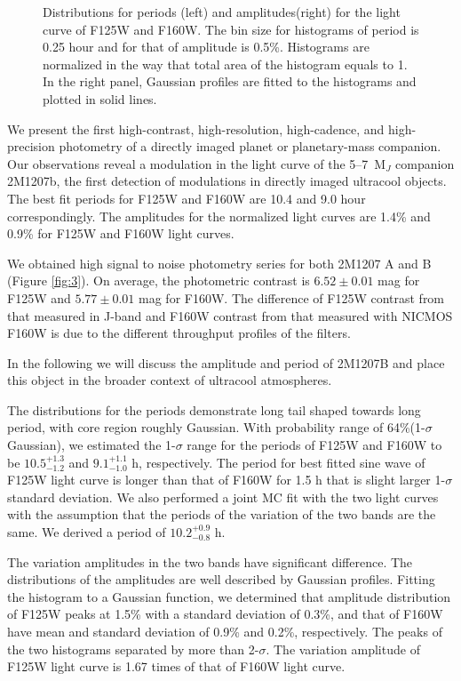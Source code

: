 \documentclass[apj]{emulateapj}
\begin{document}
\begin{figure*}
  \centering
  \caption{Distributions for periods (left) and amplitudes(right) for the light
    curve of F125W and F160W. The bin size for histograms of period is
  0.25 hour and for that of amplitude is 0.5\%. Histograms are
  normalized in the way that total area of the histogram equals to
  1. In the right panel, Gaussian profiles are fitted to the
  histograms and plotted in solid lines.}
  \label{fig:4}
\end{figure*}

\label{Results}
We present the first high-contrast, high-resolution, high-cadence, and
high-precision photometry of a directly imaged planet or
planetary-mass companion. Our observations reveal a modulation in the
light curve of the 5--7~M$_{J}$ companion 2M1207b, the first detection
of modulations in directly imaged ultracool objects.  The best fit
periods for F125W and F160W are 10.4 and 9.0 hour correspondingly. The
amplitudes for the normalized light curves are 1.4\% and 0.9\% for
F125W and F160W light curves. 

We obtained high signal to noise photometry series for both 2M1207 A
and B (Figure \ref{fig:3}). On average, the photometric contrast is
$6.52\pm0.01$ mag for
F125W and $5.77\pm0.01$ mag for F160W. The difference of F125W contrast
from that measured in J-band \citep{Mohanty2007} and
F160W contrast from that measured with NICMOS F160W 
\citep{Song2006} is due to the different throughput profiles of the
filters.

In the following we will discuss the amplitude and period of 2M1207B
and place this object in the broader context of ultracool atmospheres.

The distributions for the periods demonstrate long tail shaped towards
long period, with core region roughly Gaussian. With probability range
of 64\%(1-$\sigma$ Gaussian), we estimated the 1-$\sigma$ range for
the periods of F125W and F160W to be  $10.5_{-1.2}^{+1.3}$ and
$9.1_{-1.0}^{+1.1}$ h, respectively. The period for best
fitted sine wave of F125W light curve is longer than that of F160W for
1.5 h that is slight larger 1-$\sigma$ standard deviation. We also
performed a joint MC fit with the two light curves with the assumption
that the periods of the variation of the two bands are the same. We
derived a period of $10.2^{+0.9}_{-0.8}$ h. 

The variation amplitudes in the two bands have significant
difference. The distributions of the amplitudes are well described by
Gaussian profiles. Fitting the histogram to a Gaussian function, we
determined that amplitude distribution of F125W peaks at 1.5\% with a
standard deviation of 0.3\%, and that of F160W have mean and standard
deviation of 0.9\% and 0.2\%, respectively. The peaks of the two
histograms separated by more than 2-$\sigma$. The variation amplitude
of F125W light curve is 1.67 times of that of F160W light curve.
\end{document}

